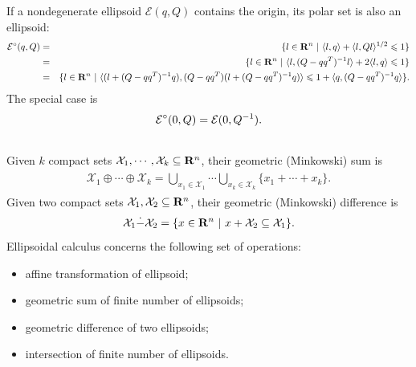 \documentclass[letterpaper,10pt,english]{sphinxmanual}
\begin{document}
If a nondegenerate ellipsoid ${\mathcal E}(q,Q)$ contains the
origin, its polar set is also an ellipsoid:
\begin{gather}
\begin{split}\begin{aligned}
{\mathcal E}^\circ(q,Q) & = & \{l\in{\bf R}^n ~|~ \langle l,q\rangle +
\langle l,Ql\rangle^{1/2}\leqslant1 \}\\
& = & \{l\in{\bf R}^n ~|~ \langle l,(Q-qq^T)^{-1}l\rangle +
2\langle l,q\rangle\leqslant1 \}\\
& = & \{l\in{\bf R}^n ~|~ \langle(l+(Q-qq^T)^{-1}q),
(Q-qq^T)(l+(Q-qq^T)^{-1}q)\rangle\leqslant1+\langle q,(Q-qq^T)^{-1}q\rangle \}.\end{aligned}\end{split}\notag
\end{gather}
The special case is
\begin{gather}
\begin{split}{\mathcal E}^\circ(0,Q) = {\mathcal E}(0,Q^{-1}).\end{split}\notag\\\begin{split}\end{split}\notag
\end{gather}
Given $k$ compact sets
${\mathcal X}_1, \cdots, {\mathcal X}_k\subseteq{\bf R}^n$, their
geometric (Minkowski) sum is
\label{chap_ellcalc:equation-minksum}\begin{gather}
\begin{split}{\mathcal X}_1\oplus\cdots\oplus{\mathcal X}_k=\bigcup_{x_1\in{\mathcal X}_1}\cdots\bigcup_{x_k\in{\mathcal X}_k}
\{x_1 + \cdots + x_k\} .\end{split}\label{chap_ellcalc-minksum}
\end{gather}
Given two compact sets
${\mathcal X}_1, {\mathcal X}_2 \subseteq{\bf R}^n$, their
geometric (Minkowski) difference is
\label{chap_ellcalc:equation-minkdiff}\begin{gather}
\begin{split}{\mathcal X}_1\dot{-}{\mathcal X}_2 = \{x\in{\bf R}^n ~|~ x + {\mathcal X}_2 \subseteq {\mathcal X}_1 \}.\end{split}\label{chap_ellcalc-minkdiff}
\end{gather}
Ellipsoidal calculus concerns the following set of operations:
\begin{itemize}
\item {} 
affine transformation of ellipsoid;

\item {} 
geometric sum of finite number of ellipsoids;

\item {} 
geometric difference of two ellipsoids;

\item {} 
intersection of finite number of ellipsoids.

\end{itemize}
\end{document}
